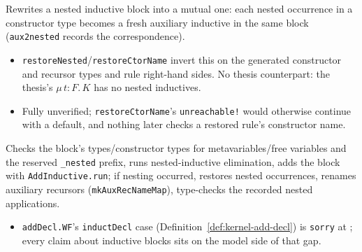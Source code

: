 \begin{definition}
\label{def:kernel-elim-nested}
\leanok
{} Rewrites a nested inductive block into a mutual one: each nested occurrence in a
constructor type becomes a fresh auxiliary inductive in the same block (\texttt{aux2nested}
records the correspondence).
\begin{itemize}
\item \texttt{restoreNested}/\texttt{restoreCtorName} invert this on the generated constructor and
recursor types and rule right-hand sides. No thesis counterpart: the thesis's $\mu\,t{:}F.\,K$ has
no nested inductives.
\item {} Fully unverified; \texttt{restoreCtorName}'s \texttt{unreachable!} would
otherwise continue with a default, and nothing later checks a restored rule's constructor name.
\end{itemize}
\end{definition}

\begin{definition}
\label{def:kernel-add-inductive}
\leanok
{}

 Checks the block's types/constructor types for metavariables/free variables and
the reserved \texttt{\_nested} prefix, runs nested-inductive elimination, adds the block with
\texttt{AddInductive.run}; if nesting occurred, restores nested occurrences, renames auxiliary
recursors (\texttt{mkAuxRecNameMap}), type-checks the recorded nested applications.
\begin{itemize}
\item {} \texttt{addDecl.WF}'s \texttt{inductDecl} case
(Definition~\ref{def:kernel-add-decl}) is \texttt{sorry} at
; every claim about inductive blocks sits on the
model side of that gap.
\end{itemize}
\end{definition}

